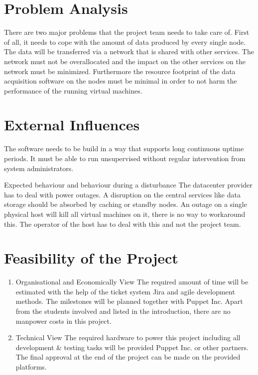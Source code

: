 \section{Problem Analysis}

There are two major problems that the project team needs to take care of. First
of all, it needs to cope with the amount of data produced by every single node.
The data will be transferred via a network that is shared with other services.
The network must not be overallocated and the impact on the other services on
the network must be minimized. Furthermore the resource footprint of the data
acquisition software on the nodes must be minimal in order to not harm the
performance of the running virtual machines.

\section{External Influences}

The software needs to be build in a way that supports long continuous uptime
periods. It must be able to run unsupervised without regular intervention from
system administrators.

Expected behaviour and behaviour during a disturbance The datacenter provider
has to deal with power outages. A disruption on the central services like data
storage should be absorbed by caching or standby nodes. An outage on a single
physical host will kill all virtual machines on it, there is no way to
workaround this. The operator of the host has to deal with this and not the
project team.

\section{Feasibility of the Project}

\begin{enumerate}
    \item Organisational and Economically View
          The required amount of time will be estimated with the help of the
          ticket system Jira and agile development methods. The milestones will be planned
          together with Puppet Inc. Apart from the students involved and listed in the
          introduction, there are no manpower costs in this project.

    \item Technical View
          The required hardware to power this project including all development
          \& testing tasks will be provided Puppet Inc. or other partners. The final
          approval at the end of the project can be made on the provided platforms.
\end{enumerate}


